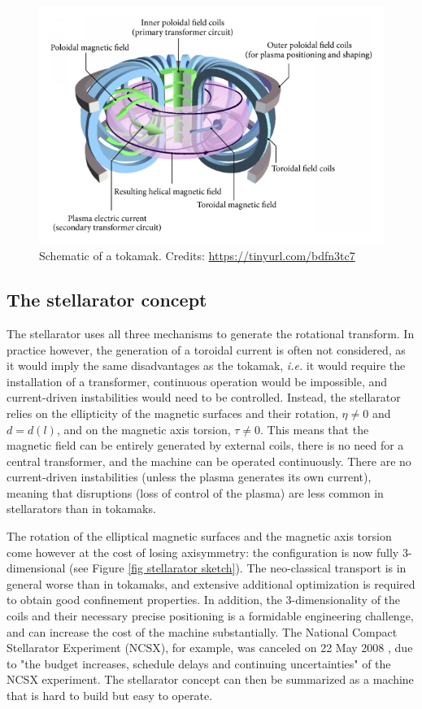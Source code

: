 \documentclass[my_thesis.tex]{subfiles}
\begin{document}
\begin{figure}
    \centering
    \includegraphics[width=\linewidth]{images/Introduction/TokamakSketch.jpg}
    \caption{Schematic of a tokamak. Credits: \url{https://tinyurl.com/bdfn3tc7}}
    \label{fig tokamak sketch}
\end{figure}

\subsection{The stellarator concept}\label{sec.stellarator concept}
The stellarator uses all three mechanisms to generate the rotational transform. In practice however, the generation of a toroidal current is often not considered, as it would imply the same disadvantages as the tokamak, \textit{i.e.} it would require the installation of a transformer, continuous operation would be impossible, and current-driven instabilities would need to be controlled. Instead, the stellarator relies on the ellipticity of the magnetic surfaces and their rotation, $\eta\neq0$ and $d = d(l)$, and on the magnetic axis torsion, $\tau\neq0$. This means that the magnetic field can be entirely generated by external coils, there is no need for a central transformer, and the machine can be operated continuously. There are no current-driven instabilities (unless the plasma generates its own current), meaning that disruptions (loss of control of the plasma) are less common in stellarators than in tokamaks.

The rotation of the elliptical magnetic surfaces and the magnetic axis torsion come however at the cost of losing axisymmetry: the configuration is now fully 3-dimensional (see Figure \ref{fig stellarator sketch}). The neo-classical transport is in general worse than in tokamaks, and extensive additional optimization is required to obtain good confinement properties. In addition, the 3-dimensionality of the coils and their necessary precise positioning is a formidable engineering challenge, and can increase the cost of the machine substantially. The National Compact Stellarator Experiment (NCSX), for example, was canceled on 22 May 2008 \citep{orbachFuturePrincetonPlasma2008}, due to "the budget increases, schedule delays and continuing uncertainties" of the NCSX experiment. The stellarator concept can then be summarized as a machine that is hard to build but easy to operate. 
\end{document}
